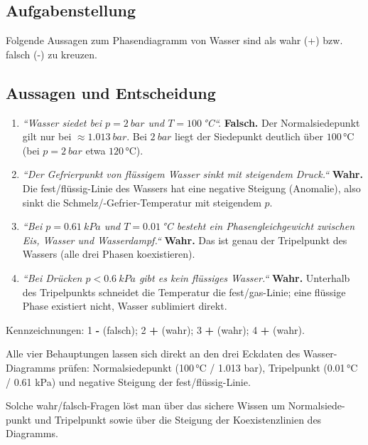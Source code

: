 
\subsection*{Aufgabenstellung}
Folgende Aussagen zum Phasendiagramm von Wasser sind als wahr (+)
bzw. falsch (-) zu kreuzen.

\subsection*{Aussagen und Entscheidung}
\begin{enumerate}
  \item \emph{``Wasser siedet bei $p=2\ bar$ und $T=100\,$°C``.}
        \textbf{Falsch.} Der Normalsiedepunkt gilt nur bei
        $\approx 1.013\ bar$. Bei $2\ bar$ liegt der Siedepunkt deutlich
        über $100\,$°C (bei $p=2\ bar$ etwa $120\,$°C).
  \item \emph{``Der Gefrierpunkt von flüssigem Wasser sinkt mit steigendem
        Druck.``} \textbf{Wahr.} Die fest/flüssig-Linie des Wassers hat
        eine negative Steigung (Anomalie), also sinkt die
        Schmelz/-Gefrier-Temperatur mit steigendem $p$.
  \item \emph{``Bei $p = 0.61\ kPa$ und $T = 0.01\,$°C besteht ein
        Phasengleichgewicht zwischen Eis, Wasser und Wasserdampf.``}
        \textbf{Wahr.} Das ist genau der Tripelpunkt des Wassers
        (alle drei Phasen koexistieren).
  \item \emph{``Bei Drücken $p < 0.6\ kPa$ gibt es kein flüssiges Wasser.``}
        \textbf{Wahr.} Unterhalb des Tripelpunkts schneidet die Temperatur die
        fest/gas-Linie; eine flüssige Phase existiert nicht, Wasser
        sublimiert direkt.
\end{enumerate}

\begin{ergebnis}
Kennzeichnungen: 1 \textbf{-} (falsch); 2 \textbf{+} (wahr); 3 \textbf{+}
(wahr); 4 \textbf{+} (wahr).
\end{ergebnis}

\begin{kontrolle}
Alle vier Behauptungen lassen sich direkt an den drei Eckdaten des
Wasser-Diagramms prüfen: Normalsiedepunkt (100\,°C / 1.013 bar),
Tripelpunkt (0.01\,°C / 0.61 kPa) und negative Steigung der
fest/flüssig-Linie.
\end{kontrolle}

\begin{merksatz}
Solche wahr/falsch-Fragen löst man über das sichere Wissen um Normalsiede-
punkt und Tripelpunkt sowie über die Steigung der Koexistenzlinien des
Diagramms.
\end{merksatz}
